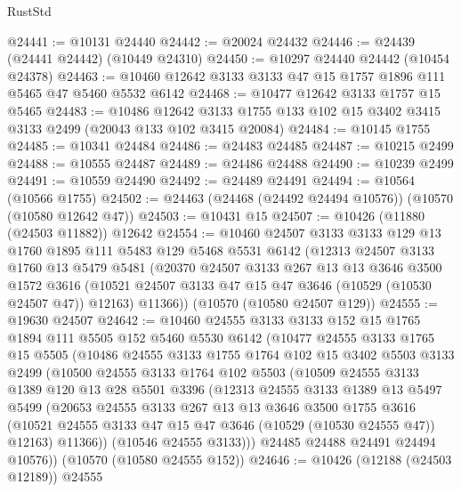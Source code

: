 \begin{lexlean}{RustStd}
\begin{coremodule}
@24441 := @10131 @24440
@24442 := @20024 @24432
@24446 := @24439 (@24441 @24442) (@10449 @24310)
@24450 := @10297 @24440 @24442 (@10454 @24378)
@24463 := @10460 @12642 @3133 @3133 @47 @15 @1757 @1896 @111 @5465 @47 @5460 @5532 @6142
@24468 := @10477 @12642 @3133 @1757 @15 @5465
@24483 := @10486
    @12642
    @3133
    @1755
    @133
    @102
    @15
    @3402
    @3415
    @3133
    @2499
    (@20043 @133 @102 @3415 @20084)
@24484 := @10145 @1755
@24485 := @10341 @24484
@24486 := @24483 @24485
@24487 := @10215 @2499
@24488 := @10555 @24487
@24489 := @24486 @24488
@24490 := @10239 @2499
@24491 := @10559 @24490
@24492 := @24489 @24491
@24494 := @10564 (@10566 @1755)
@24502 := @24463 (@24468 (@24492 @24494 @10576)) (@10570 (@10580 @12642 @47))
@24503 := @10431 @15
@24507 := @10426 (@11880 (@24503 @11882)) @12642
@24554 := @10460
    @24507
    @3133
    @3133
    @129
    @13
    @1760
    @1895
    @111
    @5483
    @129
    @5468
    @5531
    @6142
    (@12313
      @24507
      @3133
      @1760
      @13
      @5479
      @5481
      (@20370
        @24507
        @3133
        @267
        @13
        @13
        @3646
        @3500
        @1572
        @3616
        (@10521 @24507 @3133 @47 @15 @47 @3646 (@10529 (@10530 @24507 @47)) @12163)
        @11366))
    (@10570 (@10580 @24507 @129))
@24555 := @19630 @24507
@24642 := @10460
    @24555
    @3133
    @3133
    @152
    @15
    @1765
    @1894
    @111
    @5505
    @152
    @5460
    @5530
    @6142
    (@10477
      @24555
      @3133
      @1765
      @15
      @5505
      (@10486
        @24555
        @3133
        @1755
        @1764
        @102
        @15
        @3402
        @5503
        @3133
        @2499
        (@10500
          @24555
          @3133
          @1764
          @102
          @5503
          (@10509
            @24555
            @3133
            @1389
            @120
            @13
            @28
            @5501
            @3396
            (@12313
              @24555
              @3133
              @1389
              @13
              @5497
              @5499
              (@20653
                @24555
                @3133
                @267
                @13
                @13
                @3646
                @3500
                @1755
                @3616
                (@10521 @24555 @3133 @47 @15 @47 @3646 (@10529 (@10530 @24555 @47)) @12163)
                @11366))
            (@10546 @24555 @3133)))
        @24485
        @24488
        @24491
        @24494
        @10576))
    (@10570 (@10580 @24555 @152))
@24646 := @10426 (@12188 (@24503 @12189)) @24555

\end{coremodule}
\end{lexlean}
